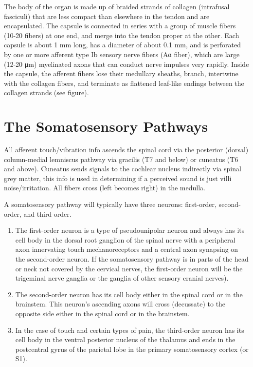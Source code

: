 The body of the organ is made up of braided strands of collagen (intrafusal fasciculi) that are less compact than elsewhere in the tendon and are encapsulated. The capsule is connected in series with a group of muscle fibers (10-20 fibers) at one end, and merge into the tendon proper at the other. Each capsule is about 1 mm long, has a diameter of about 0.1 mm, and is perforated by one or more afferent type Ib sensory nerve fibers (Aɑ fiber), which are large (12-20 μm) myelinated axons that can conduct nerve impulses very rapidly. Inside the capsule, the afferent fibers lose their medullary sheaths, branch, intertwine with the collagen fibers, and terminate as flattened leaf-like endings between the collagen strands (see figure).

\hypertarget{the-somatosensory-pathways}{%
\section{The Somatosensory Pathways}\label{the-somatosensory-pathways}}

All afferent touch/vibration info ascends the spinal cord via the posterior (dorsal) column-medial lemniscus pathway via gracilis (T7 and below) or cuneatus (T6 and above). Cuneatus sends signals to the cochlear nucleus indirectly via spinal grey matter, this info is used in determining if a perceived sound is just villi noise/irritation. All fibers cross (left becomes right) in the medulla.

A somatosensory pathway will typically have three neurons: first-order, second-order, and third-order.

\begin{enumerate}
\def\labelenumi{\arabic{enumi}.}
\tightlist
\item
  The first-order neuron is a type of pseudounipolar neuron and always has its cell body in the dorsal root ganglion of the spinal nerve with a peripheral axon innervating touch mechanoreceptors and a central axon synapsing on the second-order neuron. If the somatosensory pathway is in parts of the head or neck not covered by the cervical nerves, the first-order neuron will be the trigeminal nerve ganglia or the ganglia of other sensory cranial nerves).
\item
  The second-order neuron has its cell body either in the spinal cord or in the brainstem. This neuron's ascending axons will cross (decussate) to the opposite side either in the spinal cord or in the brainstem.
\item
  In the case of touch and certain types of pain, the third-order neuron has its cell body in the ventral posterior nucleus of the thalamus and ends in the postcentral gyrus of the parietal lobe in the primary somatosensory cortex (or S1).
\end{enumerate}

